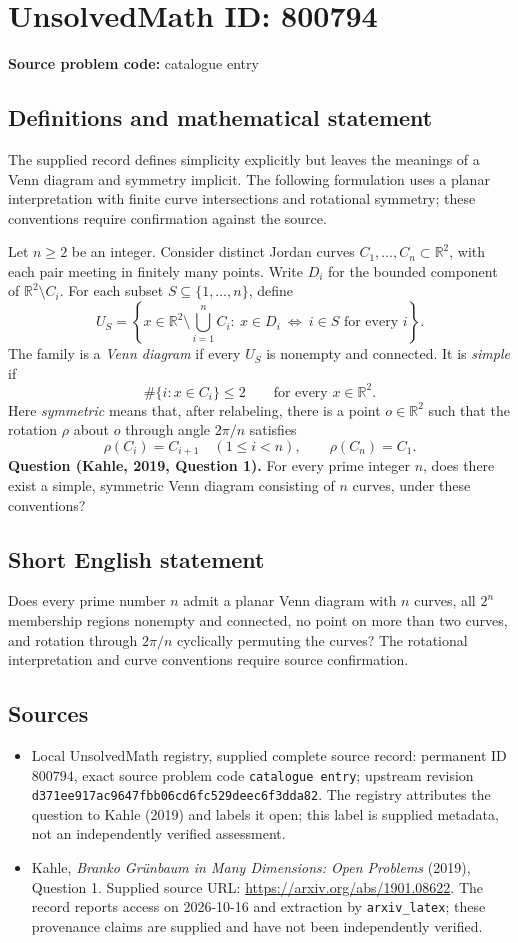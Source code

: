 \documentclass[11pt]{article}
\newcommand{\R}{\mathbb{R}}
\begin{document}
\section*{UnsolvedMath ID: 800794}
\textbf{Source problem code:} catalogue entry
\subsection{Definitions and mathematical statement}
The supplied record defines simplicity explicitly but leaves the meanings of a Venn diagram and symmetry implicit. The following formulation uses a planar interpretation with finite curve intersections and rotational symmetry; these conventions require confirmation against the source.

Let \(n\geq 2\) be an integer. Consider distinct Jordan curves \(C_1,\ldots,C_n\subset\R^2\), with each pair meeting in finitely many points. Write \(D_i\) for the bounded component of \(\R^2\setminus C_i\). For each subset \(S\subseteq\{1,\ldots,n\}\), define
\[
U_S=\left\{x\in\R^2\setminus\bigcup_{i=1}^n C_i:\ x\in D_i\ \Longleftrightarrow\ i\in S\text{ for every }i\right\}.
\]
The family is a \emph{Venn diagram} if every \(U_S\) is nonempty and connected. It is \emph{simple} if
\[
\#\{i:x\in C_i\}\leq 2\qquad\text{for every }x\in\R^2.
\]
Here \emph{symmetric} means that, after relabeling, there is a point \(o\in\R^2\) such that the rotation \(\rho\) about \(o\) through angle \(2\pi/n\) satisfies
\[
\rho(C_i)=C_{i+1}\quad(1\leq i<n),\qquad \rho(C_n)=C_1.
\]
\textbf{Question (Kahle, 2019, Question 1).} For every prime integer \(n\), does there exist a simple, symmetric Venn diagram consisting of \(n\) curves, under these conventions?
\subsection{Short English statement}
Does every prime number \(n\) admit a planar Venn diagram with \(n\) curves, all \(2^n\) membership regions nonempty and connected, no point on more than two curves, and rotation through \(2\pi/n\) cyclically permuting the curves? The rotational interpretation and curve conventions require source confirmation.
\subsection{Sources}
\begin{itemize}
\item Local UnsolvedMath registry, supplied complete source record: permanent ID \(800794\), exact source problem code \texttt{catalogue entry}; upstream revision \texttt{d371ee917ac9647fbb06cd6fc529deec6f3dda82}. The registry attributes the question to Kahle (2019) and labels it open; this label is supplied metadata, not an independently verified assessment.
\item Kahle, \emph{Branko Gr\"unbaum in Many Dimensions: Open Problems} (2019), Question 1. Supplied source URL: \url{https://arxiv.org/abs/1901.08622}. The record reports access on 2026-10-16 and extraction by \texttt{arxiv\_latex}; these provenance claims are supplied and have not been independently verified.
\end{itemize}
\end{document}
